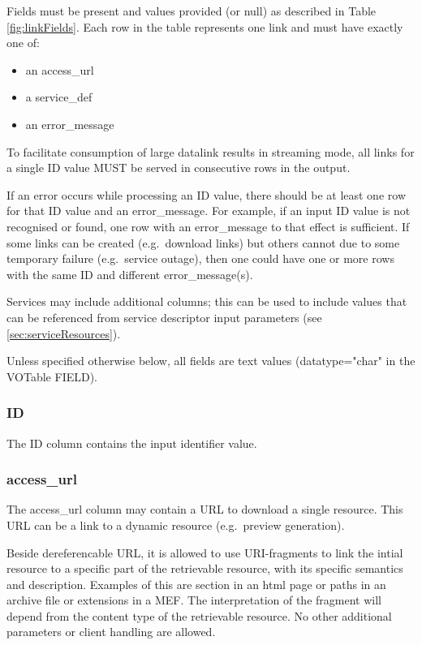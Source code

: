 \documentclass[11pt,a4paper]{ivoa}
\newcommand{\attval}[2]{#1={\allowbreak}{"}#2{"}}
\begin{document}
Fields must be present and values provided
(or null) as described in Table \ref{fig:linkFields}. Each row in the table
represents one link and must have exactly one of:
\begin{itemize}
  \item an access\_url
  \item a service\_def
  \item an error\_message
\end{itemize}

To facilitate consumption of large datalink results in streaming mode, all links 
for a single ID value MUST be served in consecutive rows in the output.

If an error occurs while processing an ID value, there should be at least
one row for that ID value and an error\_message. For example, if an input
ID value is not recognised or found, one row with an error\_message
to that effect is sufficient.
If some links can be created (e.g.\ download links)
but others cannot due to some temporary failure (e.g.\ service outage),
then one could have one or more rows with the same ID and different
error\_message(s).

Services may include additional columns; this can be used to include
values that can be referenced from service descriptor input parameters
(see \ref{sec:serviceResources}).

Unless specified otherwise below, all fields are text values (\attval{datatype}{char} 
in the VOTable FIELD).

\subsubsection{ID}

The ID column contains the input identifier value.


\subsubsection{access\_url}

The access\_url column may contain a URL to download a single resource.
This URL can be a link to a dynamic resource (e.g.\ preview generation).

Beside dereferencable URL, it is allowed to use URI-fragments to link the intial resource to a specific part of the retrievable resource, with its specific semantics and description. Examples of this are section in an html page or paths in an archive file or extensions in a MEF.
The interpretation of the fragment will depend from the content type of the retrievable resource.
No other additional parameters or client handling are allowed.
\end{document}
